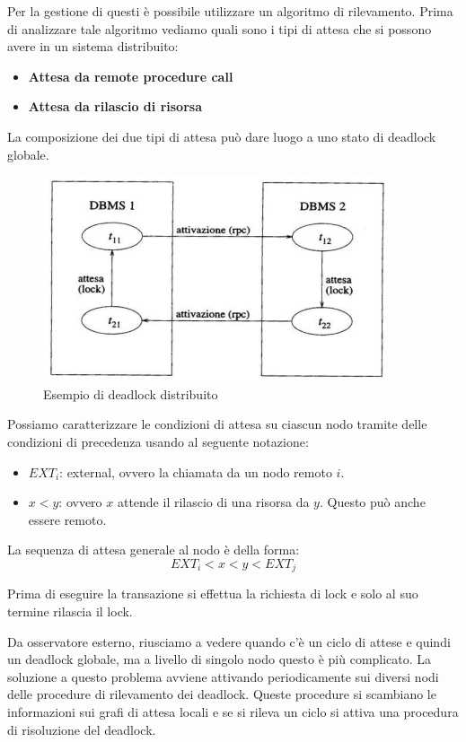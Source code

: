 Per la gestione di questi è possibile utilizzare un algoritmo di rilevamento.
Prima di analizzare tale algoritmo vediamo quali sono i tipi di attesa che
si possono avere in un sistema distribuito:
\begin{itemize}
      \item \textbf{Attesa da remote procedure call}
      \item \textbf{Attesa da rilascio di risorsa}
\end{itemize}
La composizione dei due tipi di attesa può dare luogo a uno stato di deadlock
globale.
\begin{figure}[!ht]
      \centering
      \includegraphics[width=.5\textwidth]{img/DDBMS/deadlock_distribuito.png}
      \caption{Esempio di deadlock distribuito}
      \label{fig:deadlock_distribuito}
\end{figure}

Possiamo caratterizzare le condizioni di attesa su ciascun nodo tramite delle
condizioni di precedenza usando al seguente notazione:
\begin{itemize}
      \item \textbf{$EXT_i$}: external, ovvero la chiamata da un nodo remoto $i$.
      \item $x < y$: ovvero $x$ attende il rilascio di una risorsa da $y$. Questo
            può anche essere remoto.
\end{itemize}
La sequenza di attesa generale al nodo è della forma:
\begin{equation*}
      EXT_i < x < y < EXT_j
\end{equation*}

\begin{nota}
      Prima di eseguire la transazione si effettua la richiesta di lock e solo
      al suo termine rilascia il lock.
\end{nota}

Da osservatore esterno, riusciamo a vedere quando c'è un ciclo di attese e
quindi un deadlock globale, ma a livello di singolo nodo questo è più complicato.
La soluzione a questo problema avviene attivando periodicamente sui diversi nodi
delle procedure di rilevamento dei deadlock. Queste procedure si scambiano le
informazioni sui grafi di attesa locali e se si rileva un ciclo si attiva una
procedura di risoluzione del deadlock.


